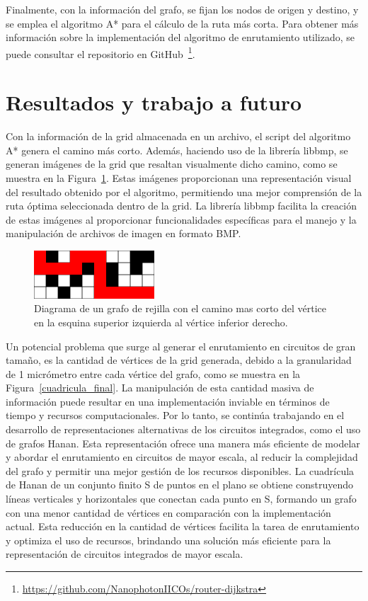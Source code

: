 \documentclass[reprint,amsmath,amssymb,aps]{revtex4-2}
\begin{document}
Finalmente, con la información del grafo, se fijan los nodos de origen y destino, y se emplea el algoritmo A* para el cálculo de la ruta más corta. Para obtener más información sobre la implementación del algoritmo de enrutamiento utilizado, se puede consultar el repositorio en GitHub~\footnote{\url{https://github.com/NanophotonIICOs/router-dijkstra}}.


\section{Resultados y trabajo a futuro}

Con la información de la grid almacenada en un archivo, el script del algoritmo A* genera el camino más corto. Además, haciendo uso de la librería libbmp, se generan imágenes de la grid que resaltan visualmente dicho camino, como se muestra en la Figura~\ref{cuadricula_final2}. Estas imágenes proporcionan una representación visual del resultado obtenido por el algoritmo, permitiendo una mejor comprensión de la ruta óptima seleccionada dentro de la grid. La librería libbmp facilita la creación de estas imágenes al proporcionar funcionalidades específicas para el manejo y la manipulación de archivos de imagen en formato BMP.

\begin{figure}[H]
	\centering
	\includegraphics[width=0.4\textwidth]{cuadricula_final2.png}
	\caption{Diagrama de un grafo de rejilla con el camino mas corto del vértice en la esquina superior izquierda al vértice inferior derecho.}
	\label{cuadricula_final2}
\end{figure}

Un potencial problema que surge al generar el enrutamiento en circuitos de gran tamaño, es la cantidad de vértices de la grid generada, debido a la granularidad de 1 micrómetro entre cada vértice del grafo, como se muestra en la Figura~\ref{cuadricula_final}. La manipulación de esta cantidad masiva de información puede resultar en una implementación inviable en términos de tiempo y recursos computacionales. Por lo tanto, se continúa trabajando en el desarrollo de representaciones alternativas de los circuitos integrados, como el uso de grafos Hanan. Esta representación ofrece una manera más eficiente de modelar y abordar el enrutamiento en circuitos de mayor escala, al reducir la complejidad del grafo y permitir una mejor gestión de los recursos disponibles. La cuadrícula de Hanan de un conjunto finito S de puntos en el plano se obtiene construyendo líneas verticales y horizontales que conectan cada punto en S, formando un grafo con una menor cantidad de vértices en comparación con la implementación actual. Esta reducción en la cantidad de vértices facilita la tarea de enrutamiento y optimiza el uso de recursos, brindando una solución más eficiente para la representación de circuitos integrados de mayor escala.
\end{document}
